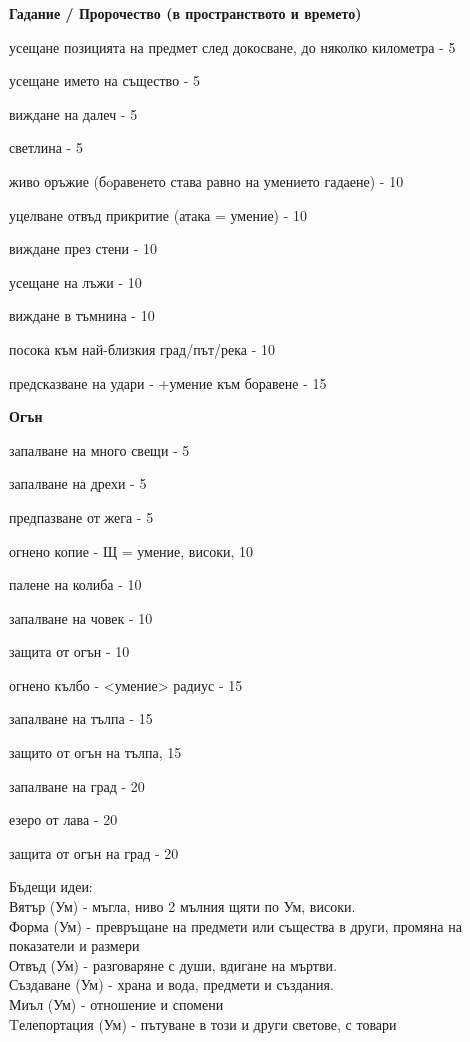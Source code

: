 \vspace{1cm}
\textbf{Гадание / Пророчество (в пространството и времето)}
\begin{itemize*}
  \item{усещане позицията на предмет след докосване, до няколко километра - 5}
  \item{усещане името на същество - 5}
  \item{виждане на далеч - 5}
  \item{светлина - 5}
  \item{живо оръжие (бoравенето става равно на умението гадаене) - 10}
  \item{уцелване отвъд прикритие (атака = умение) - 10}
  \item{виждане през стени - 10}
  \item{усещане на лъжи - 10}
  \item{виждане в тъмнина - 10}
  \item{посока към най-близкия град/път/река - 10}
  \item{предсказване на удари - +умение към боравене - 15}
\end{itemize*}


\vspace{1cm}
\textbf{Огън}
\begin{itemize*}
  \item{запалване на много свещи - 5}
  \item{запалване на дрехи - 5}
  \item{предпазване от жега - 5}
  \item{огнено копие - Щ = умение, високи, 10}
  \item{палене на колиба - 10}
  \item{запалване на човек - 10}
  \item{защита от огън - 10}
  \item{огнено кълбо - <умение> радиус - 15}
  \item{запалване на тълпа - 15}
  \item{защито от огън на тълпа, 15}
  \item{запалване на град - 20}
  \item{езеро от лава - 20}
  \item{защита от огън на град - 20}
\end{itemize*}

Бъдещи идеи:  \\
Вятър (Ум)        - мъгла, ниво 2 мълния щяти по Ум, високи.                                         \\
Форма (Ум)        - превръщане на предмети или същества в други, промяна на показатели и размери     \\
Отвъд (Ум)        - разговаряне с души, вдигане на мъртви.                                           \\
Създаване (Ум)    - храна и вода, предмети и създания.                                               \\
Миъл (Ум)         - отношение и спомени                                                              \\
Tелепортация (Ум) - пътуване в този и други светове, с товари                                        \\


